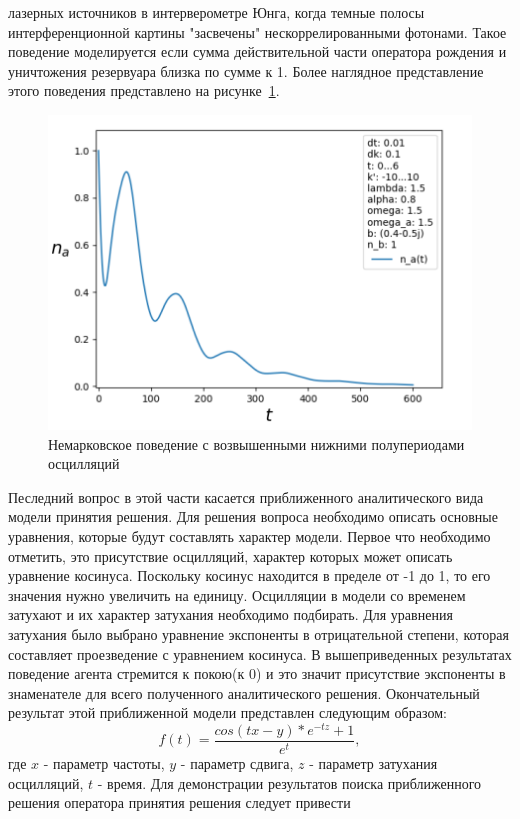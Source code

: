 лазерных источников в интерверометре Юнга, когда темные полосы интерференционной картины "засвечены"
нескоррелированными фотонами.
Такое поведение моделируется если сумма действительной части оператора рождения и уничтожения резервуара
близка по сумме к 1.
Более наглядное представление этого поведения представлено на рисунке~\ref{fig:sr_gauss}.
\begin{figure}[h!]
    \centering
    \captionsetup{justification=centering}
    \includegraphics[width=0.7\linewidth]{pictures/result_second_4.png}
    \caption{Немарковское поведение с возвышенными нижними полупериодами осцилляций}
    \label{fig:sr_gauss}
\end{figure}
Песледний вопрос в этой части касается приближенного аналитического вида модели принятия решения.
Для решения вопроса необходимо описать основные уравнения, которые будут составлять характер модели.
Первое что необходимо отметить, это присутствие осцилляций, характер которых может описать уравнение
косинуса.
Поскольку косинус находится в пределе от -1 до 1, то его значения нужно увеличить на единицу.
Осцилляции в модели со временем затухают и их характер затухания необходимо подбирать.
Для уравнения затухания было выбрано уравнение экспоненты в отрицательной степени, которая составляет
проезведение с уравнением косинуса.
В вышеприведенных результатах поведение агента стремится к покою(к 0) и это значит присутствие экспоненты
в знаменателе для всего полученного аналитического решения.
Окончательный результат этой приближенной модели представлен следующим образом:
\begin{equation}
    f(t) = \frac{cos(tx - y)*e^{-tz} + 1}{e^{t}},
\end{equation}
где $x$ - параметр частоты, $y$ - параметр сдвига, $z$ - параметр затухания осцилляций, $t$ - время.
Для демонстрации результатов поиска приближенного решения оператора принятия решения следует привести
